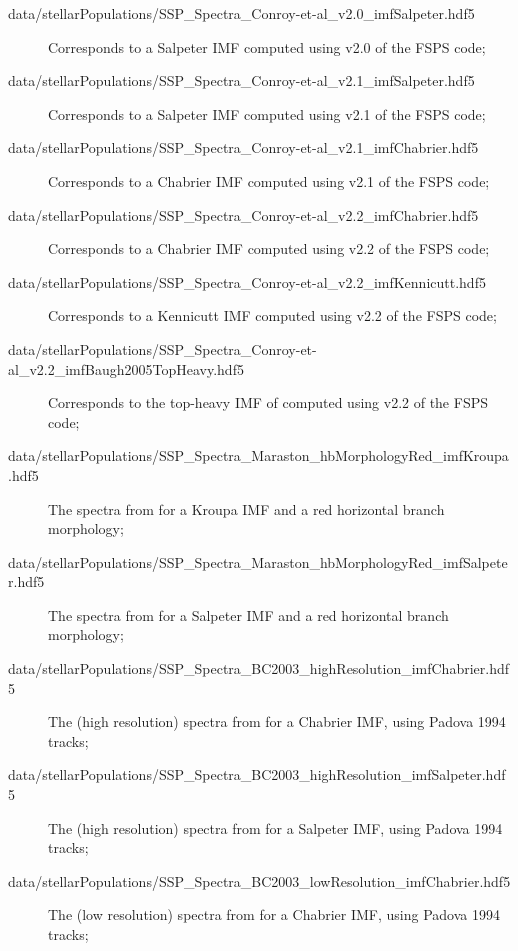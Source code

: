 \begin{description}
 \item [{\normalfont \ttfamily data/stellarPopulations/SSP\_Spectra\_Conroy-et-al\_v2.0\_imfSalpeter.hdf5}] Corresponds to a Salpeter IMF computed using v2.0 of the {\normalfont \ttfamily FSPS} code;
 \item [{\normalfont \ttfamily data/stellarPopulations/SSP\_Spectra\_Conroy-et-al\_v2.1\_imfSalpeter.hdf5}]  Corresponds to a Salpeter IMF computed using v2.1 of the {\normalfont \ttfamily FSPS} code;
 \item [{\normalfont \ttfamily data/stellarPopulations/SSP\_Spectra\_Conroy-et-al\_v2.1\_imfChabrier.hdf5}]  Corresponds to a Chabrier IMF computed using v2.1 of the {\normalfont \ttfamily FSPS} code;
 \item [{\normalfont \ttfamily data/stellarPopulations/SSP\_Spectra\_Conroy-et-al\_v2.2\_imfChabrier.hdf5}]  Corresponds to a Chabrier IMF computed using v2.2 of the {\normalfont \ttfamily FSPS} code;
 \item [{\normalfont \ttfamily data/stellarPopulations/SSP\_Spectra\_Conroy-et-al\_v2.2\_imfKennicutt.hdf5}]  Corresponds to a Kennicutt IMF computed using v2.2 of the {\normalfont \ttfamily FSPS} code;
 \item [{\normalfont \ttfamily data/stellarPopulations/SSP\_Spectra\_Conroy-et-al\_v2.2\_imfBaugh2005TopHeavy.hdf5}]  Corresponds to the top-heavy IMF of \cite{baugh_can_2005} computed using v2.2 of the {\normalfont \ttfamily FSPS} code;
 \item [{\normalfont \ttfamily data/stellarPopulations/SSP\_Spectra\_Maraston\_hbMorphologyRed\_imfKroupa.hdf5}] The spectra from \cite{maraston_evolutionary_2005} for a Kroupa IMF and a red horizontal branch morphology;
 \item [{\normalfont \ttfamily data/stellarPopulations/SSP\_Spectra\_Maraston\_hbMorphologyRed\_imfSalpeter.hdf5}] The spectra from \cite{maraston_evolutionary_2005} for a Salpeter IMF and a red horizontal branch morphology; 
 \item [{\normalfont \ttfamily data/stellarPopulations/SSP\_Spectra\_BC2003\_highResolution\_imfChabrier.hdf5}] The (high resolution) spectra from \cite{bruzual_stellar_2003} for a Chabrier IMF, using Padova 1994 tracks;
 \item [{\normalfont \ttfamily data/stellarPopulations/SSP\_Spectra\_BC2003\_highResolution\_imfSalpeter.hdf5}] The (high resolution) spectra from \cite{bruzual_stellar_2003} for a Salpeter IMF, using Padova 1994 tracks;
 \item [{\normalfont \ttfamily data/stellarPopulations/SSP\_Spectra\_BC2003\_lowResolution\_imfChabrier.hdf5}] The (low resolution) spectra from \cite{bruzual_stellar_2003} for a Chabrier IMF, using Padova 1994 tracks;

\end{description}
